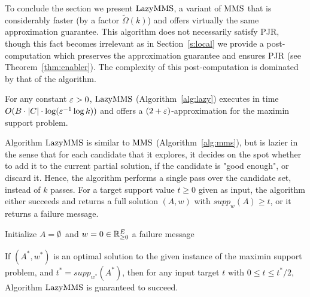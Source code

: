 To conclude the section we present $\lazy$, a variant of $\operatorname{MMS}$ that is considerably faster (by a factor $\tilde{\Omega}(k)$) and offers virtually the same approximation guarantee. 
This algorithm does not necessarily satisfy PJR, though this fact becomes irrelevant as in Section~\ref{s:local} we provide a post-computation which preserves the approximation guarantee and ensures PJR (see Theorem~\ref{thm:enabler}). The complexity of this post-computation is dominated by that of the algorithm.

\begin{theorem}\label{thm:2eps}
For any constant $\varepsilon>0$, $\lazy$ (Algorithm~\ref{alg:lazy}) executes in time $O(B\cdot |C|\cdot \log(\varepsilon^{-1} \log k))$ and offers a $(2+\varepsilon)$-approximation for the maximin support problem.
\end{theorem}

Algorithm $\lazy$ is similar to $\operatorname{MMS}$ (Algorithm~\ref{alg:mms}), but is lazier in the sense that for each candidate that it explores, it decides on the spot whether to add it to the current partial solution, if the candidate is "good enough", or discard it. Hence, the algorithm performs a single pass over the candidate set, instead of $k$ passes. 
For a target support value $t\geq 0$ given as input, the algorithm either succeeds and returns a full solution $(A,w)$ with $supp_w(A)\geq t$, or it returns a failure message. 

\begin{algorithm}[htb]\label{alg:lazy}
\SetAlgoLined
{}
Initialize $A=\emptyset$\ and $w=0\in\mathbb{R}_{\geq 0}^E$\;
\Return a failure message\;
\caption{$\lazy$}
\end{algorithm}

\begin{lemma}\label{lem:success}
If $(A^*, w^*)$ is an optimal solution to the given instance of the maximin support problem, and $t^*=supp_{w^*}(A^*)$, then for any input target $t$ with $0\leq t\leq t^*/2$, Algorithm $\lazy$ is guaranteed to succeed.
\end{lemma}

